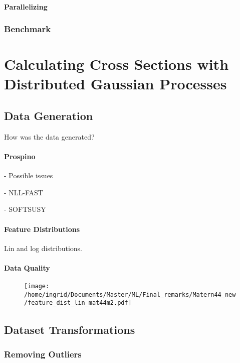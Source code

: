\documentclass[twoside,english]{uiofysmaster}
\begin{document}
\subsubsection{Parallelizing}

\subsection{Benchmark}





\chapter{Calculating Cross Sections with Distributed Gaussian Processes}

\section{Data Generation}

How was the data generated?

\subsubsection{Prospino}

- Possible issues

- NLL-FAST

- SOFTSUSY

\subsubsection{Feature Distributions}

Lin and log distributions. 

\subsubsection{Data Quality}

\begin{figure}
\centering
\texttt{[image: /home/ingrid/Documents/Master/ML/Final\_remarks/Matern44\_new/feature\_dist\_lin\_mat44m2.pdf]}
\end{figure}

\section{Dataset Transformations}

\subsection{Removing Outliers}
\end{document}
